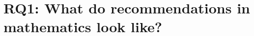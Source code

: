 \documentclass[sigconf,anonymous]{acmart}
\begin{document}





\section{RQ1: What do recommendations in mathematics look like?}
\end{document}

